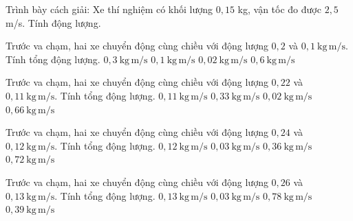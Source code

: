 \begin{bt}
Trình bày cách giải: Xe thí nghiệm có khối lượng $0,15$ kg, vận tốc đo được $2,5$ m/s. Tính động lượng.
\end{bt}

\begin{ex}
Trước va chạm, hai xe chuyển động cùng chiều với động lượng $0,2$ và $0,1\ \mathrm{kg\,m/s}$. Tính tổng động lượng.
\choice
{\True $0,3\ \mathrm{kg\,m/s}$}
{$0,1\ \mathrm{kg\,m/s}$}
{$0,02\ \mathrm{kg\,m/s}$}
{$0,6\ \mathrm{kg\,m/s}$}
\end{ex}

\begin{ex}
Trước va chạm, hai xe chuyển động cùng chiều với động lượng $0,22$ và $0,11\ \mathrm{kg\,m/s}$. Tính tổng động lượng.
\choice
{$0,11\ \mathrm{kg\,m/s}$}
{\True $0,33\ \mathrm{kg\,m/s}$}
{$0,02\ \mathrm{kg\,m/s}$}
{$0,66\ \mathrm{kg\,m/s}$}
\end{ex}

\begin{ex}
Trước va chạm, hai xe chuyển động cùng chiều với động lượng $0,24$ và $0,12\ \mathrm{kg\,m/s}$. Tính tổng động lượng.
\choice
{$0,12\ \mathrm{kg\,m/s}$}
{$0,03\ \mathrm{kg\,m/s}$}
{\True $0,36\ \mathrm{kg\,m/s}$}
{$0,72\ \mathrm{kg\,m/s}$}
\end{ex}

\begin{ex}
Trước va chạm, hai xe chuyển động cùng chiều với động lượng $0,26$ và $0,13\ \mathrm{kg\,m/s}$. Tính tổng động lượng.
\choice
{$0,13\ \mathrm{kg\,m/s}$}
{$0,03\ \mathrm{kg\,m/s}$}
{$0,78\ \mathrm{kg\,m/s}$}
{\True $0,39\ \mathrm{kg\,m/s}$}
\end{ex}

